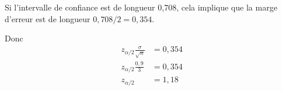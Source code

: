 \begin{questions}
\begin{parts}
    \begin{solution}
        Si l'intervalle de confiance est de longueur 0,708, cela implique que la marge d'erreur est de longueur $0,708/2=0,354$.

        Donc 
        \begin{align*}
            z_{\alpha/2}\frac{\sigma}{\sqrt{n}}&=0,354\\
            z_{\alpha/2}\frac{0,9}{3}&=0,354\\
            z_{\alpha/2}&=1,18
        \end{align*}
        
    \end{solution}
\end{parts}
\pageblanche
\end{questions}

 
